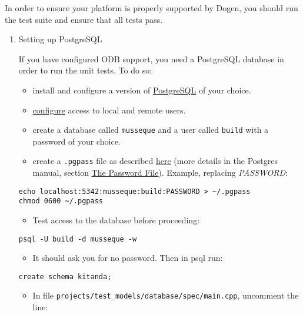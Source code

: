 \documentclass[11pt]{article}
\begin{document}
\begin{enumerate}
In order to ensure your platform is properly supported by Dogen, you
should run the test suite and ensure that all tests pass.

\begin{enumerate}
\item Setting up PostgreSQL
\label{sec-3-1-2-3-1}

If you have configured ODB support, you need a PostgreSQL database in
order to run the unit tests. To do so:

\begin{itemize}
\item install and configure a version of \href{http://www.postgresql.org/}{PostgreSQL} of your choice.
\item \href{http://www.cyberciti.biz/tips/postgres-allow-remote-access-tcp-connection.html}{configure} access to local and remote users.
\item create a database called \texttt{musseque} and a user called \texttt{build} with a
password of your choice.
\item create a \texttt{.pgpass} file as described \href{http://wiki.postgresql.org/wiki/Pgpass}{here} (more details in the
Postgres manual, section \href{http://www.postgresql.org/docs/current/static/libpq-pgpass.html}{The Password File}). Example, replacing
\emph{PASSWORD}:
\end{itemize}

\begin{verbatim}
echo localhost:5342:musseque:build:PASSWORD > ~/.pgpass
chmod 0600 ~/.pgpass
\end{verbatim}

\begin{itemize}
\item Test access to the database before proceeding:
\end{itemize}

\begin{verbatim}
psql -U build -d musseque -w
\end{verbatim}

\begin{itemize}
\item It should ask you for no password. Then in psql run:
\end{itemize}

\begin{verbatim}
create schema kitanda;
\end{verbatim}

\begin{itemize}
\item In file \texttt{projects/test\_models/database/spec/main.cpp}, uncomment the line:
\end{itemize}


\end{enumerate}
\end{enumerate}
\end{document}
